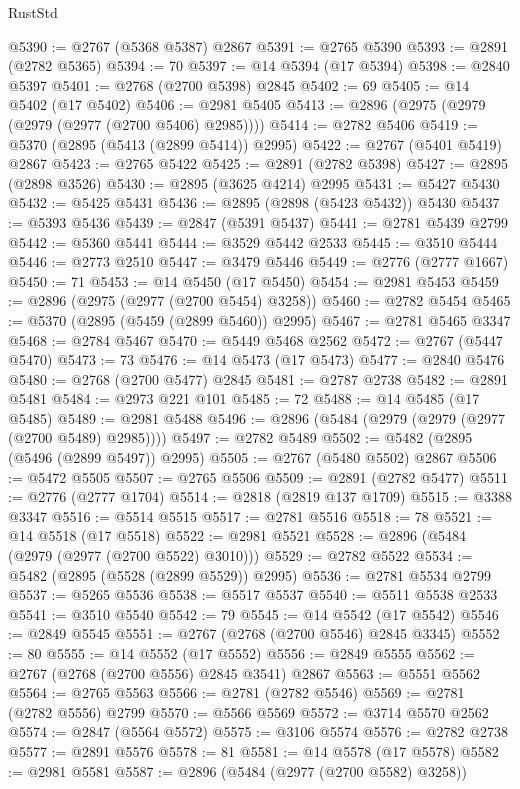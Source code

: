 \begin{lexlean}{RustStd}
\begin{coremodule}
@5390 := @2767 (@5368 @5387) @2867
@5391 := @2765 @5390
@5393 := @2891 (@2782 @5365)
@5394 := 70
@5397 := @14 @5394 (@17 @5394)
@5398 := @2840 @5397
@5401 := @2768 (@2700 @5398) @2845
@5402 := 69
@5405 := @14 @5402 (@17 @5402)
@5406 := @2981 @5405
@5413 := @2896 (@2975 (@2979 (@2979 (@2977 (@2700 @5406) @2985))))
@5414 := @2782 @5406
@5419 := @5370 (@2895 (@5413 (@2899 @5414)) @2995)
@5422 := @2767 (@5401 @5419) @2867
@5423 := @2765 @5422
@5425 := @2891 (@2782 @5398)
@5427 := @2895 (@2898 @3526)
@5430 := @2895 (@3625 @4214) @2995
@5431 := @5427 @5430
@5432 := @5425 @5431
@5436 := @2895 (@2898 (@5423 @5432)) @5430
@5437 := @5393 @5436
@5439 := @2847 (@5391 @5437)
@5441 := @2781 @5439 @2799
@5442 := @5360 @5441
@5444 := @3529 @5442 @2533
@5445 := @3510 @5444
@5446 := @2773 @2510
@5447 := @3479 @5446
@5449 := @2776 (@2777 @1667)
@5450 := 71
@5453 := @14 @5450 (@17 @5450)
@5454 := @2981 @5453
@5459 := @2896 (@2975 (@2977 (@2700 @5454) @3258))
@5460 := @2782 @5454
@5465 := @5370 (@2895 (@5459 (@2899 @5460)) @2995)
@5467 := @2781 @5465 @3347
@5468 := @2784 @5467
@5470 := @5449 @5468 @2562
@5472 := @2767 (@5447 @5470)
@5473 := 73
@5476 := @14 @5473 (@17 @5473)
@5477 := @2840 @5476
@5480 := @2768 (@2700 @5477) @2845
@5481 := @2787 @2738
@5482 := @2891 @5481
@5484 := @2973 @221 @101
@5485 := 72
@5488 := @14 @5485 (@17 @5485)
@5489 := @2981 @5488
@5496 := @2896 (@5484 (@2979 (@2979 (@2977 (@2700 @5489) @2985))))
@5497 := @2782 @5489
@5502 := @5482 (@2895 (@5496 (@2899 @5497)) @2995)
@5505 := @2767 (@5480 @5502) @2867
@5506 := @5472 @5505
@5507 := @2765 @5506
@5509 := @2891 (@2782 @5477)
@5511 := @2776 (@2777 @1704)
@5514 := @2818 (@2819 @137 @1709)
@5515 := @3388 @3347
@5516 := @5514 @5515
@5517 := @2781 @5516
@5518 := 78
@5521 := @14 @5518 (@17 @5518)
@5522 := @2981 @5521
@5528 := @2896 (@5484 (@2979 (@2977 (@2700 @5522) @3010)))
@5529 := @2782 @5522
@5534 := @5482 (@2895 (@5528 (@2899 @5529)) @2995)
@5536 := @2781 @5534 @2799
@5537 := @5265 @5536
@5538 := @5517 @5537
@5540 := @5511 @5538 @2533
@5541 := @3510 @5540
@5542 := 79
@5545 := @14 @5542 (@17 @5542)
@5546 := @2849 @5545
@5551 := @2767 (@2768 (@2700 @5546) @2845 @3345)
@5552 := 80
@5555 := @14 @5552 (@17 @5552)
@5556 := @2849 @5555
@5562 := @2767 (@2768 (@2700 @5556) @2845 @3541) @2867
@5563 := @5551 @5562
@5564 := @2765 @5563
@5566 := @2781 (@2782 @5546)
@5569 := @2781 (@2782 @5556) @2799
@5570 := @5566 @5569
@5572 := @3714 @5570 @2562
@5574 := @2847 (@5564 @5572)
@5575 := @3106 @5574
@5576 := @2782 @2738
@5577 := @2891 @5576
@5578 := 81
@5581 := @14 @5578 (@17 @5578)
@5582 := @2981 @5581
@5587 := @2896 (@5484 (@2977 (@2700 @5582) @3258))

\end{coremodule}
\end{lexlean}
